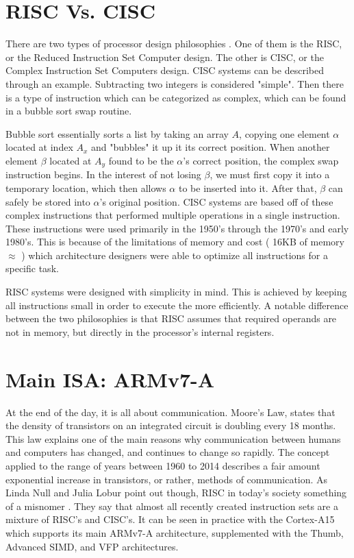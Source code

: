 \documentclass[12pt]{scrreprt}
\begin{document}
	\section{RISC Vs. CISC}
	There are two types of processor design philosophies \autocite[5]{riscGuide}. One of them is the RISC, or the Reduced Instruction Set Computer design. The other is CISC, or the Complex Instruction Set Computers design. CISC systems can be described through an example. Subtracting two integers is considered "simple". Then there is a type of instruction which can be categorized as complex, which can be found in a bubble sort swap routine.

	
	Bubble sort essentially sorts a list by taking an array $ A $, copying one element $ \alpha $ located at index $ A_{x} $ and "bubbles" it up it its correct position.
	When another element $\beta$ located at $ A_{y} $ found to be the $ \alpha $'s correct position, the complex swap instruction begins.
	In the interest of not losing $\beta$, we must first copy it into a temporary location, which then allows $\alpha$ to be inserted into it.
	After that, $\beta$ can safely be stored into $\alpha$'s original position.
	CISC systems are based off of these complex instructions that performed multiple operations in a single instruction.
	These instructions were used primarily in the 1950's through the 1970's and early 1980's.
	This is because of the limitations of memory and cost ( 16KB of memory $\approx$  ) which architecture designers were able to optimize all instructions for a specific task.

	RISC systems were designed with simplicity in mind.
	This is achieved by keeping all instructions small in order to execute the more efficiently.
	A notable difference between the two philosophies is that RISC assumes that required operands are not in memory, but directly in the processor's internal registers.

	\section{Main ISA: ARMv7-A}

	At the end of the day, it is all about communication.
	Moore's Law, states that the density of transistors on an integrated circuit is doubling every 18 months.
	This law explains one of the main reasons why communication between humans and computers has changed, and continues to change so rapidly.
	The concept applied to the range of years between 1960 to 2014 describes a fair amount exponential increase in transistors, or rather, methods of communication.
	As Linda Null and Julia Lobur point out though, RISC in today's society something of a misnomer \autocite[327]{classtext}.
	They say that almost all recently created instruction sets are a mixture of RISC's and CISC's.
	It can be seen in practice with the Cortex-A15 which supports its main ARMv7-A architecture, supplemented with the Thumb, Advanced SIMD, and VFP architectures.
\end{document}
